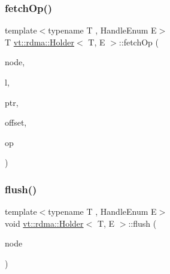 \mbox{\label{structvt_1_1rdma_1_1_holder_a21514973be4a2a9107be043fe727d9f0}} 
\subsubsection{\texorpdfstring{fetch\+Op()}{fetchOp()}}
{\footnotesize\ttfamily template$<$typename T , Handle\+Enum E$>$ \\
T \hyperlink{structvt_1_1rdma_1_1_holder}{vt\+::rdma\+::\+Holder}$<$ T, E $>$\+::fetch\+Op (\begin{DoxyParamCaption}\item[{\hyperlink{namespacevt_a866da9d0efc19c0a1ce79e9e492f47e2}{vt\+::\+Node\+Type}}]{node,  }\item[{\hyperlink{namespacevt_1_1rdma_ac5c20b41a653e520b6305d4d454ecb70}{Lock}}]{l,  }\item[{T}]{ptr,  }\item[{int}]{offset,  }\item[{M\+P\+I\+\_\+\+Op}]{op }\end{DoxyParamCaption})}

\mbox{\label{structvt_1_1rdma_1_1_holder_af2bb524d70bdaa0eaad2a394c0e9b633}} 
\subsubsection{\texorpdfstring{flush()}{flush()}}
{\footnotesize\ttfamily template$<$typename T , Handle\+Enum E$>$ \\
void \hyperlink{structvt_1_1rdma_1_1_holder}{vt\+::rdma\+::\+Holder}$<$ T, E $>$\+::flush (\begin{DoxyParamCaption}\item[{\hyperlink{namespacevt_a866da9d0efc19c0a1ce79e9e492f47e2}{vt\+::\+Node\+Type}}]{node }\end{DoxyParamCaption})}

\mbox{\label{structvt_1_1rdma_1_1_holder_a667a140d3db4f68da8af0f9d6533a88a}} 
